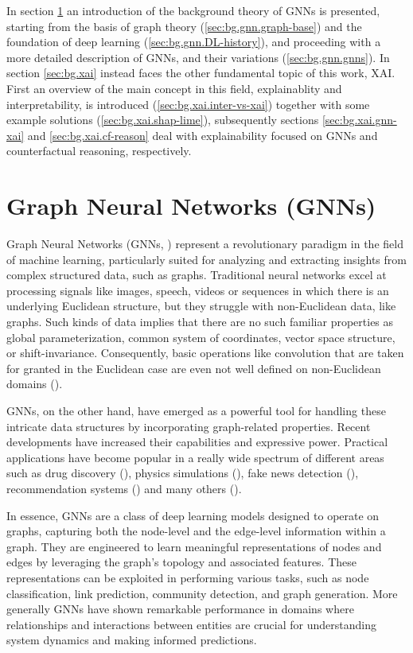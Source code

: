 \documentclass[binding=0.6cm]{sapthesis}
\newcommand{\mycite}[1]{(\cite{#1})}
\begin{document}
In section \ref{sec:bg.gnn} an introduction of the background theory of GNNs is presented, starting from the basis of graph theory (\cref{sec:bg.gnn.graph-base}) and the foundation of deep learning (\cref{sec:bg.gnn.DL-history}), and proceeding with a more detailed description of GNNs, and their variations (\cref{sec:bg.gnn.gnns}). In section \ref{sec:bg.xai} instead faces the other fundamental topic of this work, XAI. First an overview of the main concept in this field, explainablity and interpretability, is introduced (\cref{sec:bg.xai.inter-vs-xai}) together with some example solutions (\cref{sec:bg.xai.shap-lime}), subsequently sections \ref{sec:bg.xai.gnn-xai} and \ref{sec:bg.xai.cf-reason} deal with explainability focused on GNNs and counterfactual reasoning, respectively.

\section{Graph Neural Networks (GNNs)}
\label{sec:bg.gnn}
Graph Neural Networks (GNNs, \cite{gnnModel2009}) represent a revolutionary paradigm in the field of machine learning, particularly suited for analyzing and extracting insights from complex structured data, such as graphs. Traditional neural networks excel at processing signals like images, speech, videos or sequences in which there is an underlying Euclidean structure, but they struggle with non-Euclidean data, like graphs. Such kinds of data implies that there are no such familiar properties as global parameterization, common system of coordinates, vector space structure, or shift-invariance. Consequently, basic operations like convolution that are taken for granted in the Euclidean case are even not well defined on non-Euclidean domains \mycite{Bronstein_2017}. 

GNNs, on the other hand, have emerged as a powerful tool for handling these intricate data structures by incorporating graph-related properties. Recent developments have increased their capabilities and expressive power. Practical applications have become popular in a really wide spectrum of different areas such as drug discovery \mycite{doi:10.1021/acs.jmedchem.9b00959}, physics simulations \mycite{sanchezgonzalez2020learning}, fake news detection \mycite{monti2019fake}, recommendation systems \mycite{eksombatchai2017pixie} and many others \mycite{hamilton2020graph}.

In essence, GNNs are a class of deep learning models designed to operate on graphs, capturing both the node-level and the edge-level information within a graph. They are engineered to learn meaningful representations of nodes and edges by leveraging the graph's topology and associated features. These representations can be exploited in performing various tasks, such as node classification, link prediction, community detection, and graph generation. More generally GNNs have shown remarkable performance in domains where relationships and interactions between entities are crucial for understanding system dynamics and making informed predictions.
\end{document}
